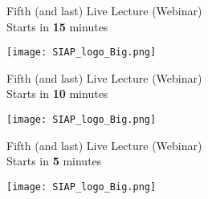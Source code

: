 \documentclass[xcolor=x11names,compress, aspectratio=169]{beamer}
\renewcommand{\(}{\begin{columns}}
\renewcommand{\)}{\end{columns}}
\newcommand{\<}[1]{\begin{column}{#1}}
\renewcommand{\>}{\end{column}}
\begin{document}
\begin{frame}
\Large{ \color{siap}{Machine Learning for Official Statistics and SDGs}}
\vspace{0.5cm}

{\huge\textcolor{brique}{Fifth (and last) Live Lecture (Webinar) \\
\vspace{0.2cm}
Starts in \textbf{15} minutes\\
}}

\vspace{0.5cm}
\begin{center}
\vspace{1cm}

\texttt{[image: SIAP\_logo\_Big.png]}
\end{center}
\end{frame}

\begin{frame}
\Large{ \color{siap}{Machine Learning for Official Statistics and SDGs}}
\vspace{0.5cm}

{\huge\textcolor{brique}{Fifth (and last) Live Lecture (Webinar) \\
\vspace{0.2cm}
Starts in \textbf{10} minutes\\
}}

\vspace{0.5cm}
\begin{center}
\vspace{1cm}

\texttt{[image: SIAP\_logo\_Big.png]}
\end{center}
\end{frame}

\begin{frame}
\Large{ \color{siap}{Machine Learning for Official Statistics and SDGs}}
\vspace{0.5cm}

{\huge\textcolor{brique}{Fifth (and last) Live Lecture (Webinar) \\
\vspace{0.2cm}
Starts in \textbf{5} minutes\\
}}

\vspace{0.5cm}
\begin{center}
\vspace{1cm}

\texttt{[image: SIAP\_logo\_Big.png]}
\end{center}
\end{frame}
\end{document}
